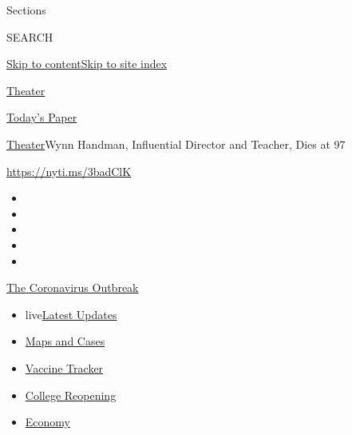 Sections

SEARCH

\protect\hyperlink{site-content}{Skip to
content}\protect\hyperlink{site-index}{Skip to site index}

\href{https://www.nytimes.com/section/theater}{Theater}

\href{https://myaccount.nytimes.com/auth/login?response_type=cookie\&client_id=vi}{}

\href{https://www.nytimes.com/section/todayspaper}{Today's Paper}

\href{/section/theater}{Theater}\textbar{}Wynn Handman, Influential
Director and Teacher, Dies at 97

\url{https://nyti.ms/3badClK}

\begin{itemize}
\item
\item
\item
\item
\item
\end{itemize}

\href{https://www.nytimes.com/news-event/coronavirus?action=click\&pgtype=Article\&state=default\&region=TOP_BANNER\&context=storylines_menu}{The
Coronavirus Outbreak}

\begin{itemize}
\tightlist
\item
  live\href{https://www.nytimes.com/2020/08/03/world/coronavirus-covid-19.html?action=click\&pgtype=Article\&state=default\&region=TOP_BANNER\&context=storylines_menu}{Latest
  Updates}
\item
  \href{https://www.nytimes.com/interactive/2020/us/coronavirus-us-cases.html?action=click\&pgtype=Article\&state=default\&region=TOP_BANNER\&context=storylines_menu}{Maps
  and Cases}
\item
  \href{https://www.nytimes.com/interactive/2020/science/coronavirus-vaccine-tracker.html?action=click\&pgtype=Article\&state=default\&region=TOP_BANNER\&context=storylines_menu}{Vaccine
  Tracker}
\item
  \href{https://www.nytimes.com/2020/08/02/us/covid-college-reopening.html?action=click\&pgtype=Article\&state=default\&region=TOP_BANNER\&context=storylines_menu}{College
  Reopening}
\item
  \href{https://www.nytimes.com/live/2020/08/03/business/stock-market-today-coronavirus?action=click\&pgtype=Article\&state=default\&region=TOP_BANNER\&context=storylines_menu}{Economy}
\end{itemize}

